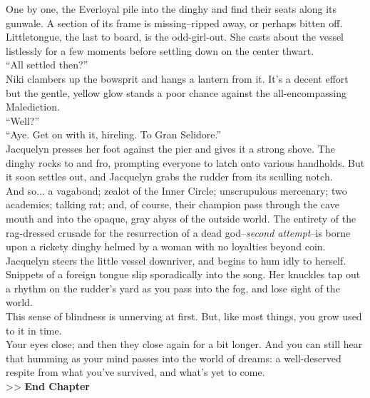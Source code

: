 One by one, the Everloyal pile into the dinghy and find their seats along its gunwale. A section of its frame is missing--ripped away, or perhaps bitten off. Littletongue, the last to board, is the odd-girl-out. She casts about the vessel listlessly for a few moments before settling down on the center thwart.\\

“All settled then?”\\

Niki clambers up the bowsprit and hangs a lantern from it. It’s a decent effort but the gentle, yellow glow stands a poor chance against the all-encompassing Malediction.\\

“Well?”\\

“Aye. Get on with it, hireling. To Gran Selidore.”\\

Jacquelyn presses her foot against the pier and gives it a strong shove. The dinghy rocks to and fro, prompting everyone to latch onto various handholds. But it soon settles out, and Jacquelyn grabs the rudder from its sculling notch.\\

And so... a vagabond; zealot of the Inner Circle; unscrupulous mercenary; two academics; talking rat; and, of course, their champion pass through the cave mouth and into the opaque, gray abyss of the outside world. The entirety of the rag-dressed crusade for the resurrection of a dead god--\emph{second attempt}--is borne upon a rickety dinghy helmed by a woman with no loyalties beyond coin.\\

Jacquelyn steers the little vessel downriver, and begins to hum idly to herself. Snippets of a foreign tongue slip sporadically into the song. Her knuckles tap out a rhythm on the rudder’s yard as you pass into the fog, and lose sight of the world.\\

This sense of blindness is unnerving at first. But, like most things, you grow used to it in time.\\

Your eyes close; and then they close again for a bit longer. And you can still hear that humming as your mind passes into the world of dreams: a well-deserved respite from what you’ve survived, and what’s yet to come.\\

>> \textbf{End Chapter}